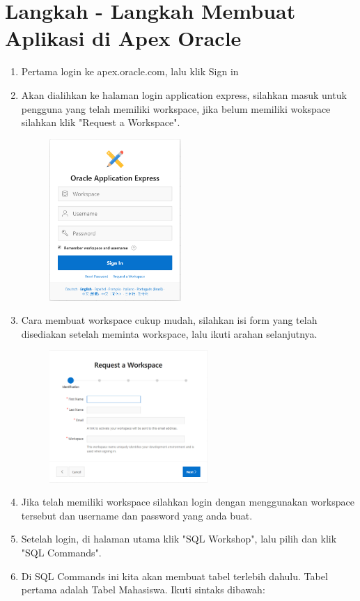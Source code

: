 \documentclass[12pt, times new roman]{article}
\begin{document}
\section{Langkah - Langkah Membuat Aplikasi di Apex Oracle}
\begin{enumerate}
\item Pertama login ke apex.oracle.com, lalu klik Sign in
\item Akan dialihkan ke halaman login application express, silahkan masuk untuk pengguna yang telah memiliki workspace, jika belum memiliki wokspace silahkan klik "Request a Workspace".
\begin{figure}[!htbp]
	\centering
	\includegraphics[width=5cm]{figures/17.png}
	\end{figure}
\item Cara membuat workspace cukup mudah, silahkan isi form yang telah disediakan setelah meminta workspace, lalu ikuti arahan selanjutnya.
\begin{figure}[!htbp]
	\centering
	\includegraphics[width=6cm]{figures/18.png}
\end{figure}
\item Jika telah memiliki workspace silahkan login dengan menggunakan workspace tersebut dan username dan password yang anda buat.
\item Setelah login, di halaman utama klik "SQL Workshop", lalu pilih dan klik "SQL Commands".
\item Di SQL Commands ini kita akan membuat tabel terlebih dahulu. Tabel pertama adalah Tabel Mahasiswa. Ikuti sintaks dibawah:

\end{enumerate}
\end{document}
